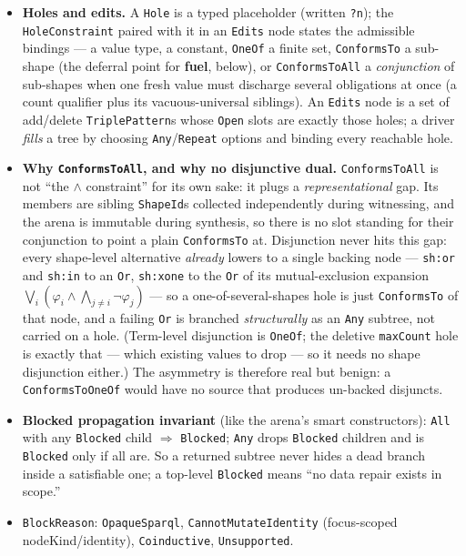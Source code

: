 \documentclass[11pt]{article}
\newcommand{\code}[1]{\texttt{#1}}
\theoremstyle{definition}
\begin{document}
\begin{itemize}[leftmargin=1.4em]
  \item \textbf{Holes and edits.} A \code{Hole} is a typed placeholder (written
  \code{?n}); the \code{HoleConstraint} paired with it in an \code{Edits} node
  states the admissible bindings --- a value type, a constant, \code{OneOf} a
  finite set, \code{ConformsTo} a sub-shape (the deferral point for
  \textbf{fuel}, below), or \code{ConformsToAll} a \emph{conjunction} of
  sub-shapes when one fresh value must discharge several obligations at once (a
  count qualifier plus its vacuous-universal siblings). An \code{Edits} node is a set of
  add/delete \code{TriplePattern}s whose \code{Open} slots are exactly those holes;
  a driver \emph{fills} a tree by choosing \code{Any}/\code{Repeat} options and
  binding every reachable hole.
  \item \textbf{Why \code{ConformsToAll}, and why no disjunctive dual.}
  \code{ConformsToAll} is not ``the $\wedge$ constraint'' for its own sake: it
  plugs a \emph{representational} gap. Its members are sibling \code{ShapeId}s
  collected independently during witnessing, and the arena is immutable during
  synthesis, so there is no slot standing for their conjunction to point a plain
  \code{ConformsTo} at. Disjunction never hits this gap: every shape-level
  alternative \emph{already} lowers to a single backing node --- \code{sh:or} and
  \code{sh:in} to an \code{Or}, \code{sh:xone} to the \code{Or} of its
  mutual-exclusion expansion $\bigvee_i(\varphi_i\wedge\bigwedge_{j\neq i}\neg\varphi_j)$ ---
  so a one-of-several-shapes hole is just \code{ConformsTo} of that node, and a
  failing \code{Or} is branched \emph{structurally} as an \code{Any} subtree, not
  carried on a hole. (Term-level disjunction is \code{OneOf}; the deletive
  \code{maxCount} hole is exactly that --- which existing values to drop --- so it
  needs no shape disjunction either.) The asymmetry is therefore real but benign:
  a \code{ConformsToOneOf} would have no source that produces un-backed disjuncts.
  \item \textbf{Blocked propagation invariant} (like the arena's smart
  constructors): \code{All} with any \code{Blocked} child $\Rightarrow$
  \code{Blocked}; \code{Any} drops \code{Blocked} children and is \code{Blocked}
  only if all are. So a returned subtree never hides a dead branch inside a
  satisfiable one; a top-level \code{Blocked} means ``no data repair exists in
  scope.''
  \item \code{BlockReason}: \code{OpaqueSparql}, \code{CannotMutateIdentity}
  (focus-scoped nodeKind/identity), \code{Coinductive}, \code{Unsupported}.
\end{itemize}
\end{document}
